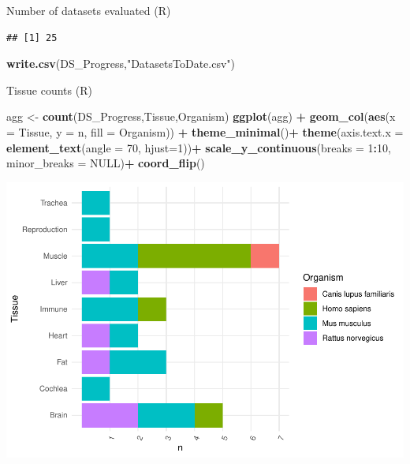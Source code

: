\documentclass[
]{article}
\newenvironment{Shaded}{\begin{snugshade}}{\end{snugshade}}
\newcommand{\DataTypeTok}[1]{\textcolor[rgb]{0.13,0.29,0.53}{#1}}
\newcommand{\DecValTok}[1]{\textcolor[rgb]{0.00,0.00,0.81}{#1}}
\newcommand{\KeywordTok}[1]{\textcolor[rgb]{0.13,0.29,0.53}{\textbf{#1}}}
\newcommand{\NormalTok}[1]{#1}
\newcommand{\OperatorTok}[1]{\textcolor[rgb]{0.81,0.36,0.00}{\textbf{#1}}}
\newcommand{\OtherTok}[1]{\textcolor[rgb]{0.56,0.35,0.01}{#1}}
\newcommand{\StringTok}[1]{\textcolor[rgb]{0.31,0.60,0.02}{#1}}
\begin{document}
Number of datasets evaluated (R)

\begin{Shaded}
\end{Shaded}

\begin{verbatim}
## [1] 25
\end{verbatim}

\begin{Shaded}
\begin{Highlighting}[]
\KeywordTok{write.csv}\NormalTok{(DS_Progress,}\StringTok{"DatasetsToDate.csv"}\NormalTok{)}
\end{Highlighting}
\end{Shaded}

Tissue counts (R)

\begin{Shaded}
\begin{Highlighting}[]
\NormalTok{agg <-}\StringTok{ }\KeywordTok{count}\NormalTok{(DS_Progress,Tissue,Organism)}
\KeywordTok{ggplot}\NormalTok{(agg) }\OperatorTok{+}
\StringTok{  }\KeywordTok{geom_col}\NormalTok{(}\KeywordTok{aes}\NormalTok{(}\DataTypeTok{x =}\NormalTok{ Tissue, }\DataTypeTok{y =}\NormalTok{ n, }\DataTypeTok{fill =}\NormalTok{ Organism)) }\OperatorTok{+}
\StringTok{  }\KeywordTok{theme_minimal}\NormalTok{()}\OperatorTok{+}
\StringTok{  }\KeywordTok{theme}\NormalTok{(}\DataTypeTok{axis.text.x =} \KeywordTok{element_text}\NormalTok{(}\DataTypeTok{angle =} \DecValTok{70}\NormalTok{, }\DataTypeTok{hjust=}\DecValTok{1}\NormalTok{))}\OperatorTok{+}
\StringTok{  }\KeywordTok{scale_y_continuous}\NormalTok{(}\DataTypeTok{breaks =} \DecValTok{1}\OperatorTok{:}\DecValTok{10}\NormalTok{, }\DataTypeTok{minor_breaks =} \OtherTok{NULL}\NormalTok{)}\OperatorTok{+}
\StringTok{  }\KeywordTok{coord_flip}\NormalTok{()}
\end{Highlighting}
\end{Shaded}

\includegraphics{Thesis_DualCodeTest_files/figure-latex/unnamed-chunk-37-1.pdf}
\end{document}
